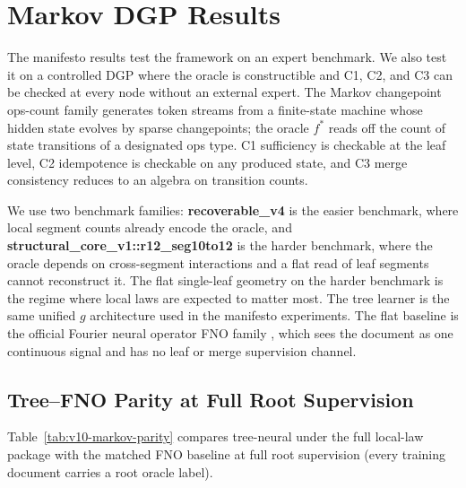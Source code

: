 \section{Markov DGP Results}\label{sec:v10-markov-results}

The manifesto results test the framework on an expert benchmark. We
also test it on a controlled DGP where the oracle is constructible
and C1, C2, and C3 can be checked at every node without an external
expert. The Markov changepoint ops-count family generates token
streams from a finite-state
machine whose hidden state evolves by sparse changepoints; the oracle
\(f^\ast\) reads off the count of state transitions of a designated
ops type. C1 sufficiency is checkable at the leaf level, C2
idempotence is checkable on any produced state, and C3 merge
consistency reduces to an algebra on transition counts.

We use two benchmark families:
\textbf{recoverable\_v4} is the easier benchmark, where local segment
counts already encode the oracle, and
\textbf{structural\_core\_v1::r12\_seg10to12} is the harder benchmark,
where the oracle depends on cross-segment interactions and a flat
read of leaf segments cannot reconstruct it. The flat single-leaf
geometry on the harder benchmark is the regime where local laws are
expected to matter most. The tree learner is the same unified \(g\)
architecture used in the manifesto experiments. The flat baseline is
the official Fourier neural operator FNO family
\citep{Kovachki23NeuralOperator,Li21FNO}, which sees the document as one
continuous signal and has no leaf or merge supervision channel.

\subsection{Tree--FNO Parity at Full Root Supervision}

Table~\ref{tab:v10-markov-parity} compares tree-neural under the full
local-law package with the matched FNO baseline at full root
supervision (every training document carries a root oracle label).

